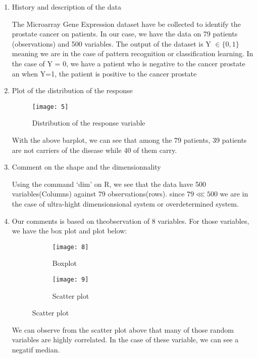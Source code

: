 \documentclass[12pt,a4paper]{article}
\begin{document}
\begin{enumerate}
\item	History and description of the data

The Microarray Gene Expression dataset have be collected to identify the prostate cancer on patients. In our case, we have the data on 79 patients (observations) and 500 variables. The output of the dataset is Y $\in\{0,1\}$ meaning we are in the case of pattern recognition or classification learning. In the case of Y = 0, we have a patient who is negative to the cancer prostate an when Y=1, the patient is positive to the cancer prostate


\item Plot of the distribution of the response

\begin{figure}[H]
	\centering
	\texttt{[image: 5]}
	\caption{Distribution of the response variable}
\end{figure}

With the above barplot, we can see that among the 79 patients, 39 patients are not carriers of the disease while 40 of them carry.


\item Comment on the shape and the dimensionnality

Using the command `dim' on R, we see that the data have 500 variables(Columns) against 79 observations(rows). since $79\lll500$ we are in the case of ultra-hight dimensionsional system or overdetermined system. 


\item Our comments is based on theobservation of 8 variables. For those variables, we have the box plot and plot below:

\begin{figure}[H]
	\centering
	\begin{subfigure}[b]{0.4\textwidth}
		\centering
		\texttt{[image: 8]}
		\caption{Boxplot}
	\end{subfigure}
	\begin{subfigure}[b]{0.4\textwidth}
		\centering
		\texttt{[image: 9]}
		\caption{Scatter plot}
	\end{subfigure}
\end{figure}

We can observe from the scatter plot above that many of those random  variables are highly correlated. In the case of these variable, we can see a negatif median.










\end{enumerate}

























  
\end{document}
